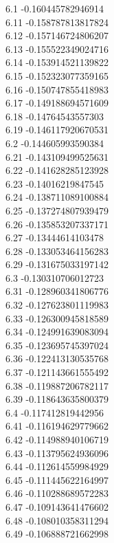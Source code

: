 {6.1	-0.160445782946914\\
6.11	-0.158787813817824\\
6.12	-0.157146724806207\\
6.13	-0.155522349024716\\
6.14	-0.153914521139822\\
6.15	-0.152323077359165\\
6.16	-0.150747855418983\\
6.17	-0.149188694571609\\
6.18	-0.14764543557303\\
6.19	-0.146117920670531\\
6.2	-0.144605993590384\\
6.21	-0.143109499525631\\
6.22	-0.141628285123928\\
6.23	-0.14016219847545\\
6.24	-0.138711089100884\\
6.25	-0.137274807939479\\
6.26	-0.135853207337171\\
6.27	-0.13444614103478\\
6.28	-0.133053464156283\\
6.29	-0.131675033197142\\
6.3	-0.130310706012723\\
6.31	-0.128960341806776\\
6.32	-0.127623801119983\\
6.33	-0.126300945818589\\
6.34	-0.124991639083094\\
6.35	-0.123695745397024\\
6.36	-0.122413130535768\\
6.37	-0.121143661555492\\
6.38	-0.119887206782117\\
6.39	-0.118643635800379\\
6.4	-0.117412819442956\\
6.41	-0.116194629779662\\
6.42	-0.114988940106719\\
6.43	-0.113795624936096\\
6.44	-0.112614559984929\\
6.45	-0.111445622164997\\
6.46	-0.110288689572283\\
6.47	-0.109143641476602\\
6.48	-0.108010358311294\\
6.49	-0.106888721662998\\
}
